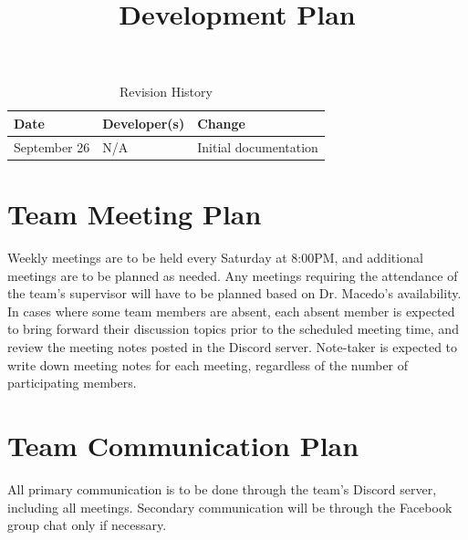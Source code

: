 \documentclass[12pt]{article}
\title{Development Plan\\\progname}
\author{\authname}
\date{}
\begin{document}
\begin{table}[hp]
\caption{Revision History} \label{TblRevisionHistory}
\begin{tabularx}{\textwidth}{llX}
\toprule
\textbf{Date} & \textbf{Developer(s)} & \textbf{Change}\\
\midrule
September 26 & N/A & Initial documentation\\
\bottomrule
\end{tabularx}
\end{table}

\newpage

\maketitle


\section{Team Meeting Plan}
Weekly meetings are to be held every Saturday at 8:00PM, and additional meetings are to be planned as needed. Any meetings requiring the attendance of the team's supervisor will have to be planned based on Dr. Macedo's availability. In cases where some team members are absent, each absent member is expected to bring forward their discussion topics prior to the scheduled meeting time, and review the meeting notes posted in the Discord server. Note-taker is expected to write down meeting notes for each meeting, regardless of the number of participating members.\\

\section{Team Communication Plan}
All primary communication is to be done through the team's Discord server, including all meetings. Secondary communication will be through the Facebook group chat only if necessary.\\
\end{document}
